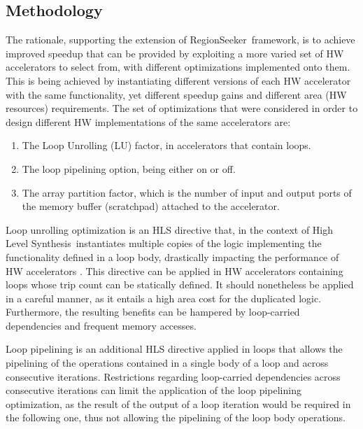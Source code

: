\documentclass[]{usiinfthesis}
\newcommand{\rseeker}{{RegionSeeker}}
\newcommand{\HLS}{{High Level Synthesis}}
\begin{document}

\subsection{Methodology}
\label{subsec:mv_meth}

The rationale, supporting the extension of \rseeker\ framework, is to achieve improved
speedup that can be provided by exploiting a more varied set of HW accelerators to select from, 
with different optimizations implemented onto them. This is being achieved by instantiating 
different versions of each HW accelerator with the same functionality, yet different speedup gains 
and different area (HW resources) requirements. The set of optimizations that were considered in 
order to design different HW implementations of the same accelerators are: 
\begin{enumerate}
\item The Loop Unrolling 
(LU) factor, in accelerators that contain loops.
\item The loop pipelining option, being either on or off.
\item The array partition factor, 
which is the number of input and output ports of the memory buffer (scratchpad) attached 
to the accelerator.
\end{enumerate}\par

Loop unrolling optimization is an HLS directive that, in the context of \HLS\, instantiates multiple 
copies of the logic implementing the functionality defined in a loop body, drastically impacting the 
performance of HW accelerators \cite{KurraApr07} \cite{KulkarniOct12}. This directive can be applied in HW
accelerators containing loops whose trip count can be statically defined. It should nonetheless
be applied in a careful manner, as it entails a high area cost for the duplicated logic. Furthermore,
the resulting benefits can be hampered by loop-carried dependencies and frequent memory
accesses.\par
Loop pipelining is an additional HLS directive applied in loops that allows the pipelining of 
the operations contained in a single body of a loop and across consecutive iterations. Restrictions 
regarding loop-carried dependencies across consecutive iterations can limit the application of the loop
pipelining optimization, as the result of the output of a loop iteration would be required in the following
one, thus not allowing the pipelining of the loop body operations.\par
\end{document}
